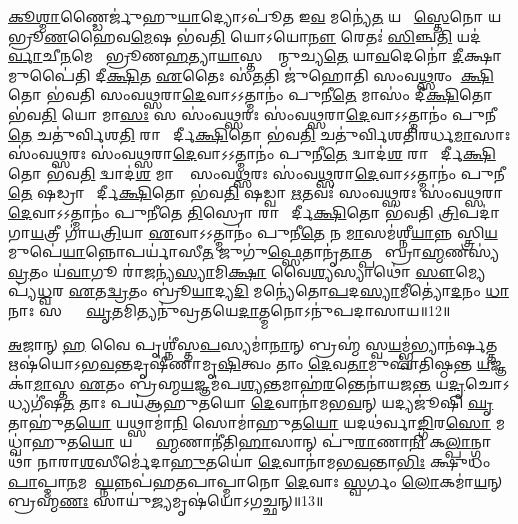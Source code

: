 \ul{𑌕𑍂}\ul{𑌶𑍍𑌮𑌾}𑌣𑍍𑌡𑍈𑌰𑍍𑌜𑍁॑𑌹𑍁\ul{𑌯𑌾}𑌦𑍍𑌯𑍋𑌽𑌪𑍂॑𑌤 𑌇\ul{𑌵} 𑌮𑌨𑍍𑌯𑍇॑\ul{𑌤} 𑌯𑌥𑌾᳚ \ul{𑌸𑍍𑌤𑍇}𑌨𑍋 𑌯𑌥𑌾᳚ 𑌭𑍍𑌰𑍂\ul{𑌣}𑌹𑍈𑌵\ul{𑌮𑍇}𑌷 𑌭॑𑌵\ul{𑌤𑌿} 𑌯𑍋𑌽𑌯𑍋\ul{𑌨𑍗} 𑌰𑍇𑌤𑌃॑ \ul{𑌸𑌿}𑌞𑍍𑌚\ul{𑌤𑌿} 𑌯𑌦॑\ul{𑌰𑍍𑌵𑌾}𑌚𑍀\ul{𑌨}𑌮𑍇𑌨𑍋᳚ 𑌭𑍍𑌰𑍂𑌣\ul{𑌹}𑌤𑍍𑌯𑌾\ul{𑌯𑌾}𑌸𑍍𑌤𑌸𑍍𑌮𑌾᳚𑌨𑍍𑌮𑍁𑌚𑍍𑌯\ul{𑌤𑍇} 𑌯𑌾\ul{𑌵}𑌦𑍇𑌨𑍋॑ \ul{𑌦𑍀}𑌕𑍍𑌷𑌾𑌮𑍁𑌪𑍈॑𑌤𑌿 𑌦𑍀\ul{𑌕𑍍𑌷𑌿}𑌤 \ul{𑌏}𑌤𑍈𑌃 𑌸॑\ul{𑌤}𑌤𑌿 𑌜𑍁॑𑌹𑍋𑌤𑌿 𑌸𑌂𑌵\ul{𑌥𑍍𑌸}𑌰𑌂 𑌦𑍀᳚\ul{𑌕𑍍𑌷𑌿}𑌤𑍋 𑌭॑𑌵𑌤𑌿 𑌸𑌂𑌵\ul{𑌥𑍍𑌸}𑌰𑌾\ul{𑌦𑍇}𑌵𑌾𑌽𑌽𑌤𑍍𑌮𑌾𑌨𑌂॑ 𑌪𑍁𑌨𑍀\ul{𑌤𑍇} 𑌮𑌾𑌸𑌂॑ 𑌦𑍀\ul{𑌕𑍍𑌷𑌿}𑌤𑍋 𑌭॑𑌵\ul{𑌤𑌿} 𑌯𑍋 𑌮𑌾\ul{𑌸𑌃} 𑌸 𑌸𑌂॑𑌵\ul{𑌥𑍍𑌸}𑌰𑌃 𑌸𑌂॑𑌵\ul{𑌥𑍍𑌸}𑌰𑌾\ul{𑌦𑍇}𑌵𑌾𑌽𑌽𑌤𑍍𑌮𑌾𑌨𑌂॑ 𑌪𑍁𑌨𑍀\ul{𑌤𑍇} 𑌚𑌤𑍁॑𑌰𑍍𑌵𑌿𑌶\ul{𑌤𑌿}\ul{} 𑌰𑌾𑌤𑍍𑌰𑍀᳚𑌰𑍍𑌦𑍀\ul{𑌕𑍍𑌷𑌿}𑌤𑍋 𑌭॑𑌵\ul{𑌤𑌿} 𑌚𑌤𑍁॑𑌰𑍍𑌵𑌿𑌶𑌤𑌿𑌰𑌰𑍍𑌧\ul{𑌮𑌾}𑌸𑌾𑌃 𑌸𑌂॑𑌵\ul{𑌥𑍍𑌸}𑌰𑌃 𑌸𑌂॑𑌵\ul{𑌥𑍍𑌸}𑌰𑌾\ul{𑌦𑍇}𑌵𑌾𑌽𑌽𑌤𑍍𑌮𑌾𑌨𑌂॑ 𑌪𑍁𑌨𑍀\ul{𑌤𑍇} 𑌦𑍍𑌵𑌾𑌦॑\ul{𑌶} 𑌰𑌾𑌤𑍍𑌰𑍀᳚𑌰𑍍𑌦𑍀\ul{𑌕𑍍𑌷𑌿}𑌤𑍋 𑌭॑𑌵\ul{𑌤𑌿} 𑌦𑍍𑌵𑌾𑌦॑\ul{𑌶} 𑌮𑌾𑌸𑌾𑌃᳚ 𑌸𑌂𑌵\ul{𑌥𑍍𑌸}𑌰𑌃 𑌸𑌂॑𑌵\ul{𑌥𑍍𑌸}𑌰𑌾\ul{𑌦𑍇}𑌵𑌾𑌽𑌽𑌤𑍍𑌮𑌾𑌨𑌂॑ 𑌪𑍁𑌨𑍀\ul{𑌤𑍇} 𑌷𑌡𑍍𑌰𑌾𑌤𑍍𑌰𑍀᳚𑌰𑍍𑌦𑍀\ul{𑌕𑍍𑌷𑌿}𑌤𑍋 𑌭॑𑌵\ul{𑌤𑌿} 𑌷𑌡𑍍𑌵𑌾 \ul{𑌋}𑌤𑌵𑌃॑ 𑌸𑌂𑌵\ul{𑌥𑍍𑌸}𑌰𑌃 𑌸𑌂॑𑌵\ul{𑌥𑍍𑌸}𑌰𑌾\ul{𑌦𑍇}𑌵𑌾𑌽𑌽𑌤𑍍𑌮𑌾𑌨𑌂॑ 𑌪𑍁𑌨𑍀𑌤𑍇 \ul{𑌤𑌿}𑌸𑍍𑌰𑍋 𑌰𑌾𑌤𑍍𑌰𑍀᳚𑌰𑍍𑌦𑍀\ul{𑌕𑍍𑌷𑌿}𑌤𑍋 𑌭॑𑌵𑌤𑌿 \ul{𑌤𑍍𑌰𑌿}𑌪𑌦𑌾॑ 𑌗𑌾\ul{𑌯}𑌤𑍍𑌰𑍀 𑌗𑌾॑𑌯\ul{𑌤𑍍𑌰𑌿}𑌯𑌾 \ul{𑌏}𑌵𑌾𑌽𑌽𑌤𑍍𑌮𑌾𑌨𑌂॑ 𑌪𑍁𑌨𑍀\ul{𑌤𑍇} 𑌨 \ul{𑌮𑌾}\ul{}𑌸𑌮॑𑌶𑍍𑌨𑍀\ul{𑌯𑌾}𑌨𑍍𑌨 𑌸𑍍𑌤𑍍𑌰𑌿\ul{𑌯}𑌮𑍁𑌪𑍇॑\ul{𑌯𑌾}𑌨𑍍𑌨𑍋𑌪𑌰𑍍𑌯𑌾॑𑌸𑍀\ul{𑌤} 𑌜𑍁𑌗𑍁॑\ul{𑌫𑍍𑌸𑍇}𑌤𑌾𑌨𑍃॑\ul{𑌤𑌾}𑌤𑍍𑌪𑌯𑍋᳚ 𑌬𑍍𑌰𑌾\ul{𑌹𑍍𑌮}𑌣𑌸𑍍𑌯॑ \ul{𑌵𑍍𑌰}𑌤𑌂 𑌯॑\ul{𑌵𑌾}𑌗𑍂 𑌰𑌾॑\ul{𑌜}𑌨𑍍𑌯॑\ul{𑌸𑍍𑌯𑌾}𑌮𑌿\ul{𑌕𑍍𑌷𑌾} 𑌵𑍈\ul{𑌶𑍍𑌯}𑌸𑍍𑌯𑌾𑌥𑍋॑ \ul{𑌸𑍗}𑌮𑍍𑌯𑍇𑌪𑍍𑌯॑\ul{𑌧𑍍𑌵}𑌰 \ul{𑌏}𑌤\ul{𑌦𑍍𑌵𑍍𑌰}𑌤𑌂 𑌬𑍍𑌰𑍂॑\ul{𑌯𑌾}𑌦𑍍𑌯\ul{𑌦𑌿} 𑌮𑌨𑍍𑌯𑍇॑𑌤𑍋\ul{𑌪}𑌦\ul{𑌸𑍍𑌯𑌾}𑌮𑍀𑌤𑍍𑌯𑍋॑\ul{𑌦}𑌨𑌂 \ul{𑌧𑌾}𑌨𑌾𑌃 𑌸𑌕𑍍𑌤𑍂𑌂᳚ \ul{𑌘𑍃}𑌤𑌮𑌿𑌤𑍍𑌯𑌨𑍁॑𑌵𑍍𑌰𑌤𑌯𑍇\ul{𑌦𑌾}𑌤𑍍𑌮𑌨𑍋𑌽𑌨𑍁॑𑌪𑌦𑌾𑌸𑌾𑌯॥12॥ 
\anuvakamend

\ul{𑌅}𑌜𑌾𑌨𑍍 \ul{𑌹} 𑌵𑍈 𑌪𑍃𑌶𑍍𑌨𑍀॑𑌸𑍍𑌤\ul{𑌪}𑌸𑍍𑌯𑌮𑌾॑\ul{𑌨𑌾}𑌨𑍍 𑌬𑍍𑌰𑌹𑍍𑌮॑ 𑌸𑍍𑌵\ul{𑌯}𑌮𑍍𑌭𑍍𑌵॑𑌭𑍍𑌯𑌾𑌨॑𑌰𑍍\mbox{}\ul{𑌷}𑌤𑍍𑌤 𑌋𑌷॑𑌯𑍋𑌽𑌭\ul{𑌵}𑌨𑍍𑌤𑌦𑍃𑌷𑍀॑𑌣𑌾𑌮𑍃\ul{𑌷𑌿}𑌤𑍍𑌵𑌂 𑌤𑌾𑌂 \ul{𑌦𑍇}𑌵\ul{𑌤𑌾}𑌮𑍁𑌪𑌾॑𑌤𑌿𑌷𑍍𑌠𑌨𑍍𑌤 \ul{𑌯}𑌜𑍍𑌞𑌕𑌾॑\ul{𑌮𑌾}𑌸𑍍𑌤 \ul{𑌏}𑌤𑌂 𑌬𑍍𑌰॑𑌹𑍍𑌮\ul{𑌯}𑌜𑍍𑌞𑌮॑𑌪\ul{𑌶𑍍𑌯}𑌨𑍍𑌤𑌮𑌾𑌹॑\ul{𑌰}𑌨𑍍𑌤𑍇𑌨𑌾॑𑌯𑌜\ul{𑌨𑍍𑌤} 𑌯\ul{𑌦𑍃}𑌚𑍋𑌽𑌧𑍍𑌯𑌗𑍀॑𑌷\ul{𑌤} 𑌤𑌾𑌃 𑌪𑌯॑𑌆𑌹𑍁𑌤𑌯𑍋 \ul{𑌦𑍇}𑌵𑌾𑌨𑌾॑𑌮𑌭\ul{𑌵}𑌨𑍍 𑌯𑌦𑍍𑌯𑌜𑍂॑𑌷𑌿 \ul{𑌘𑍃}𑌤𑌾𑌹𑍁॑𑌤\ul{𑌯𑍋} 𑌯𑌥𑍍𑌸𑌾𑌮𑌾॑\ul{𑌨𑌿} 𑌸𑍋𑌮𑌾॑𑌹𑍁𑌤\ul{𑌯𑍋} 𑌯𑌦𑌥॑𑌰𑍍𑌵𑌾\ul{𑌙𑍍𑌗𑌿}𑌰\ul{𑌸𑍋} 𑌮𑌧𑍍𑌵𑌾॑𑌹𑍁𑌤\ul{𑌯𑍋} 𑌯𑌦𑍍𑌬𑍍𑌰𑌾᳚\ul{𑌹𑍍𑌮}𑌣𑌾𑌨𑍀॑𑌤𑌿\ul{𑌹𑌾}𑌸𑌾𑌨𑍍 𑌪𑍁॑\ul{𑌰𑌾}𑌣𑌾\ul{𑌨𑌿} 𑌕\ul{𑌲𑍍𑌪𑌾}𑌨𑍍𑌗𑌾𑌥𑌾॑ 𑌨𑌾𑌰𑌾\ul{𑌶}\ul{}𑌸𑍀𑌰𑍍𑌮𑍇॑𑌦𑌾\ul{𑌹𑍁}𑌤𑌯𑍋॑ \ul{𑌦𑍇}𑌵𑌾𑌨𑌾॑𑌮𑌭\ul{𑌵}𑌨𑍍𑌤𑌾\ul{𑌭𑌿𑌃} 𑌕𑍍𑌷𑍁𑌧𑌂॑ \ul{𑌪𑌾}𑌪𑍍𑌮𑌾\ul{𑌨}𑌮\-𑌪𑌾᳚\ul{𑌘𑍍𑌨}𑌨𑍍𑌨𑌪॑𑌹𑌤𑌪𑌾𑌪𑍍𑌮𑌾𑌨𑍋 \ul{𑌦𑍇}𑌵𑌾𑌃 \ul{𑌸𑍍𑌵}𑌰𑍍𑌗𑌂 \ul{𑌲𑍋}𑌕𑌮𑌾॑\ul{𑌯}𑌨𑍍 𑌬𑍍𑌰𑌹𑍍𑌮॑\ul{𑌣𑌃} 𑌸𑌾𑌯𑍁॑\ul{𑌜𑍍𑌯}𑌮𑍃𑌷॑𑌯𑍋𑌽𑌗𑌚𑍍𑌛𑌨𑍍॥13॥\anuvakamend

